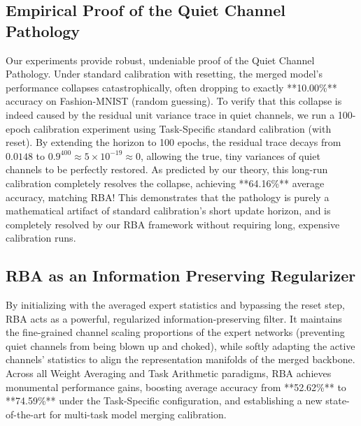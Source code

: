 \documentclass{article}
\begin{document}
\subsection{Empirical Proof of the Quiet Channel Pathology}
Our experiments provide robust, undeniable proof of the Quiet Channel Pathology.
Under standard calibration with resetting, the merged model's performance collapses catastrophically, often dropping to exactly **10.00\%** accuracy on Fashion-MNIST (random guessing).
To verify that this collapse is indeed caused by the residual unit variance trace in quiet channels, we run a 100-epoch calibration experiment using Task-Specific standard calibration (with reset).
By extending the horizon to 100 epochs, the residual trace decays from $0.0148$ to $0.9^{400} \approx 5 \times 10^{-19} \approx 0$, allowing the true, tiny variances of quiet channels to be perfectly restored.
As predicted by our theory, this long-run calibration completely resolves the collapse, achieving **64.16\%** average accuracy, matching RBA!
This demonstrates that the pathology is purely a mathematical artifact of standard calibration's short update horizon, and is completely resolved by our RBA framework without requiring long, expensive calibration runs.

\subsection{RBA as an Information Preserving Regularizer}
By initializing with the averaged expert statistics and bypassing the reset step, RBA acts as a powerful, regularized information-preserving filter.
It maintains the fine-grained channel scaling proportions of the expert networks (preventing quiet channels from being blown up and choked), while softly adapting the active channels' statistics to align the representation manifolds of the merged backbone.
Across all Weight Averaging and Task Arithmetic paradigms, RBA achieves monumental performance gains, boosting average accuracy from **52.62\%** to **74.59\%** under the Task-Specific configuration, and establishing a new state-of-the-art for multi-task model merging calibration.
\end{document}
